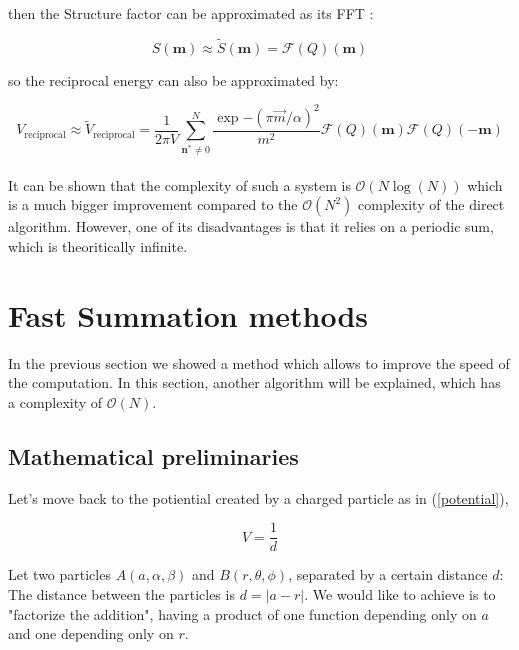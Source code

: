 \documentclass[12pt,twoside,a4paper]{report}
\begin{document}
then the Structure factor can be approximated as its FFT :

\begin{equation}
   S(\textbf{m}) \approx \widetilde{S}(\textbf{m}) = \mathcal{F}(Q)(\textbf{m})
\end{equation}

so the reciprocal energy can also be approximated by:

\begin{equation}
   V_{\text{reciprocal}} \approx \widetilde{V}_{\text{reciprocal}}   =\frac{1}{2 \pi V} \sum\limits_{\textbf{n}^* \neq 0}^{N}  \frac{\exp{-(\pi \overrightarrow{m}/\alpha)^2}}{m^2}\mathcal{F}(Q)(\textbf{m})\mathcal{F}(Q)(-\textbf{m})
\end{equation} \\

It can be shown that the complexity of such a system is $\mathcal{O}(N \log(N))$ which is a much bigger improvement compared to the $\mathcal{O}(N^2)$ complexity of the direct algorithm. However, one of its disadvantages is that it relies on a periodic sum, which is theoritically infinite.



\section{Fast Summation methods}

    In the previous section we showed a method which allows to improve the speed of the computation. In this section, another algorithm will be explained, which has a complexity of $\mathcal{O}(N)$.\\
    
	\subsection{Mathematical preliminaries}
	
	Let's move back to the potiential created by a charged particle as in (\ref{potential}),
	
	\begin{equation*}
	V = \frac{1}{d}
	\end{equation*}
	
	Let two particles $A(a,\alpha,\beta)$ and $B(r,\theta,\phi)$, separated by a certain distance $d$: The distance between the particles is $d = |a - r|$.
	We would like to achieve is to "factorize the addition", having a product of one function depending only on $a$ and one depending only on $r$.
	
\end{document}
